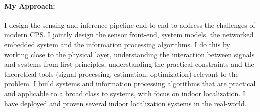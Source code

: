 \documentclass[10pt]{article}
\begin{document}
\paragraph{My Approach: }
I design the sensing and inference pipeline end-to-end to address the challenges of modern CPS. I jointly design the sensor front-end, system models, the networked embedded system and the information processing algorithms. I do this by working close to the physical layer, understanding the interaction between signals and systems from first principles, understanding the practical constraints and the theoretical tools (signal processing, estimation, optimization) relevant to the problem. 
I build systems and information processing algorithms that are practical and applicable to a broad class to systems, with focus on indoor localization. I have deployed and proven several indoor localization systems in the real-world.

\end{document}
